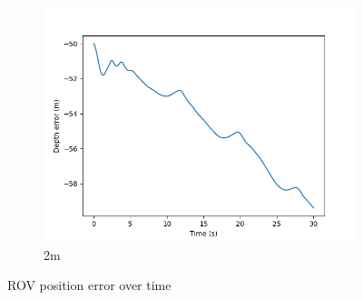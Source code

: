 \documentclass[class=article, crop=false]{standalone}
\begin{document}
\begin{figure}
\begin{subfigure}[b]{0.48\textwidth}
        \includegraphics{scenario1/rov-50m/2.0m/rov_depth_error_uncontrolled}
        \caption{2m}
        \label{}
    \end{subfigure}

    \caption{ROV position error over time}
\end{figure}
\end{document}
